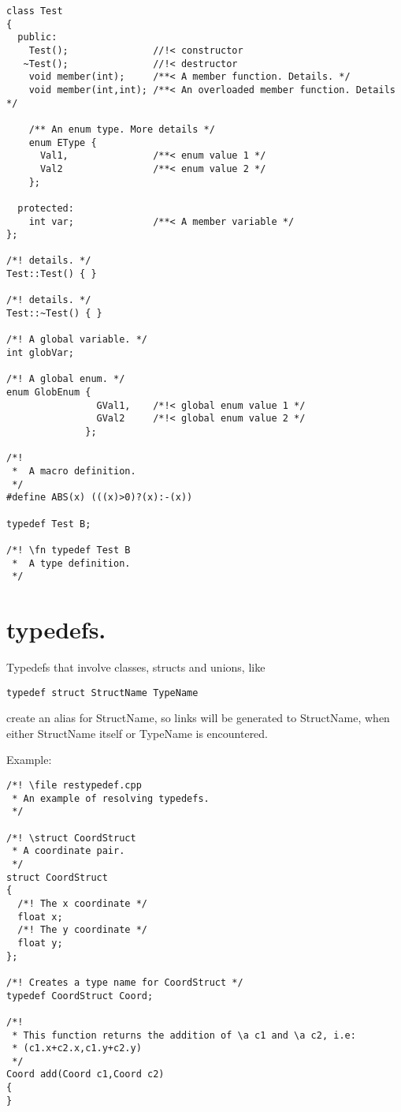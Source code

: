 \begin{Desc}
\begin{VerbInclude}
\begin{verbatim}
class Test
{
  public:
    Test();               //!< constructor 
   ~Test();               //!< destructor 
    void member(int);     /**< A member function. Details. */
    void member(int,int); /**< An overloaded member function. Details */

    /** An enum type. More details */
    enum EType { 
      Val1,               /**< enum value 1 */ 
      Val2                /**< enum value 2 */ 
    };                

  protected:
    int var;              /**< A member variable */
};

/*! details. */
Test::Test() { }

/*! details. */
Test::~Test() { }

/*! A global variable. */
int globVar;

/*! A global enum. */
enum GlobEnum { 
                GVal1,    /*!< global enum value 1 */ 
                GVal2     /*!< global enum value 2 */ 
              };

/*!
 *  A macro definition.
 */ 
#define ABS(x) (((x)>0)?(x):-(x))

typedef Test B;

/*! \fn typedef Test B
 *  A type definition. 
 */
\end{verbatim}
\end{VerbInclude}
 \end{Desc}
\hypertarget{autolink_resolving}{}\section{typedefs.}\label{autolink_resolving}
Typedefs that involve classes, structs and unions, like 

\footnotesize\begin{verbatim}
typedef struct StructName TypeName
\end{verbatim}
\normalsize
 create an alias for StructName, so links will be generated to StructName, when either StructName itself or TypeName is encountered.

\begin{Desc}
\item[Example:]

\begin{VerbInclude}\begin{verbatim}/*! \file restypedef.cpp
 * An example of resolving typedefs.
 */

/*! \struct CoordStruct
 * A coordinate pair.
 */
struct CoordStruct
{
  /*! The x coordinate */
  float x;
  /*! The y coordinate */
  float y;
};

/*! Creates a type name for CoordStruct */ 
typedef CoordStruct Coord;

/*! 
 * This function returns the addition of \a c1 and \a c2, i.e:
 * (c1.x+c2.x,c1.y+c2.y)
 */
Coord add(Coord c1,Coord c2)
{
}
\end{verbatim}
\end{VerbInclude}
  \end{Desc}

